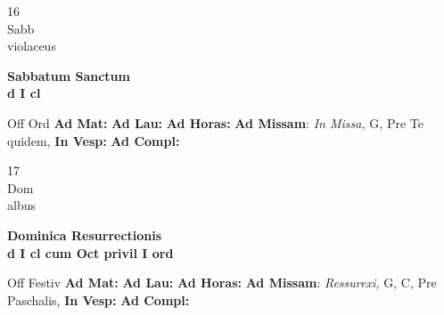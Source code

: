 \documentclass[10pt, openany]{book}
\begin{document}
        \begin{center}
            \begin{minipage}{3.5in}
                \vspace{2em}
                \begin{minipage}{0.5in}
                    {\Huge 16} \\
                    {\normalsize Sabb} \\
                    {\normalsize violaceus}
                \end{minipage}
                \begin{minipage}{3.0in}
                    \textbf{ \large Sabbatum Sanctum \\
                    \textnormal{\normalsize d I cl}} \\ 
                \end{minipage}
                \begin{justify}Off Ord
                    \textbf{Ad Mat: }
                    \textbf{Ad Lau: }
                    \textbf{Ad Horas: }\textbf{Ad Missam}: \textit{In Missa,} G, Pre Te quidem,  
                    \textbf{In Vesp: }
                    \textbf{Ad Compl: }
                \end{justify}
            \end{minipage}
        \end{center}
    
        \begin{center}
            \begin{minipage}{3.5in}
                \vspace{2em}
                \begin{minipage}{0.5in}
                    {\Huge 17} \\
                    {\normalsize Dom} \\
                    {\normalsize albus}
                \end{minipage}
                \begin{minipage}{3.0in}
                    \textbf{ \large Dominica Resurrectionis \\
                    \textnormal{\normalsize d I cl cum Oct privil I ord}} \\ 
                \end{minipage}
                \begin{justify}Off Festiv
                    \textbf{Ad Mat: }
                    \textbf{Ad Lau: }
                    \textbf{Ad Horas: }\textbf{Ad Missam}: \textit{Ressurexi,} G, C, Pre Paschalis,  
                    \textbf{In Vesp: }
                    \textbf{Ad Compl: }
                \end{justify}
            \end{minipage}
        \end{center}
    
\end{document}
